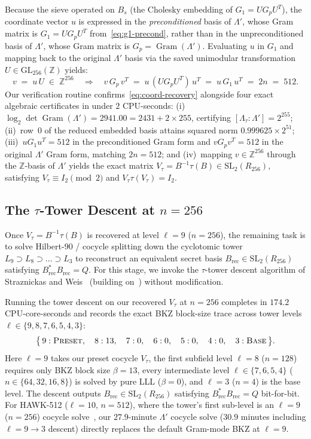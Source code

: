 \documentclass[11pt,a4paper]{article}
\theoremstyle{definition}
\newcommand{\Z}{\mathbb{Z}}
\newcommand{\Lt}{\Lambda_\tau}
\newcommand{\Lp}{\Lambda'}
\newcommand{\Vt}{V_\tau}
\newcommand{\Gram}{\operatorname{Gram}}
\begin{document}
Because the sieve operated on $B_s$ (the Cholesky embedding of $G_1 = U G_p U^T$), the coordinate vector $u$ is expressed in the \emph{preconditioned} basis of $\Lp$, whose Gram matrix is $G_1 = U G_p U^T$ from~\eqref{eq:g1-precond}, rather than in the unpreconditioned basis of $\Lp$, whose Gram matrix is $G_p = \Gram(\Lp)$. Evaluating $u$ in $G_1$ and mapping back to the original $\Lp$ basis via the saved unimodular transformation $U \in \mathrm{GL}_{256}(\Z)$ yields:
\begin{equation}\label{eq:coord-recovery}
  v \;=\; u\,U \;\in\; \Z^{256}
  \quad\Longrightarrow\quad
  v\,G_p\,v^T \;=\; u\,(U G_p U^T)\,u^T \;=\; u\,G_1\,u^T \;=\; 2n \;=\; 512.
\end{equation}
Our verification routine confirms~\eqref{eq:coord-recovery} alongside four exact algebraic certificates in under $2$ CPU-seconds: (i)~$\log_2 \det \Gram(\Lp) = 2941.00 = 2431 + 2 \times 255$, certifying $[\Lt : \Lp] = 2^{255}$; (ii)~row~$0$ of the reduced embedded basis attains squared norm $0.999625 \times 2^{51}$; (iii)~$u G_1 u^T = 512$ in the preconditioned Gram form and $v G_p v^T = 512$ in the original $\Lp$ Gram form, matching $2n = 512$; and (iv)~mapping $v \in \Z^{256}$ through the $\Z$-basis of $\Lp$ yields the exact matrix $\Vt = B^{-1}\tau(B) \in \mathrm{SL}_2(R_{256})$, satisfying $\Vt \equiv I_2 \pmod 2$ and $\Vt\tau(\Vt) = I_2$.

\subsection{The \texorpdfstring{$\tau$}{tau}-Tower Descent at \texorpdfstring{$n=256$}{n=256}}
Once $\Vt = B^{-1}\tau(B)$ is recovered at level $\ell=9$ ($n=256$), the remaining task is to solve Hilbert-90 / cocycle splitting down the cyclotomic tower $L_9 \supset L_8 \supset \dots \supset L_3$ to reconstruct an equivalent secret basis $B_{\mathrm{rec}} \in \mathrm{SL}_2(R_{256})$ satisfying $B_{\mathrm{rec}}^* B_{\mathrm{rec}} = Q$. For this stage, we invoke the $\tau$-tower descent algorithm of Straznickas and Weis~\cite{SW26} (building on~\cite{vGP25}) without modification.

Running the tower descent on our recovered $\Vt$ at $n=256$ completes in $174.2$ CPU-core-seconds and records the exact BKZ block-size trace across tower levels $\ell \in \{9, 8, 7, 6, 5, 4, 3\}$:
\[
  \bigl\{\, 9:\textsc{Preset},\quad 8:13,\quad 7:0,\quad 6:0,\quad 5:0,\quad 4:0,\quad 3:\textsc{Base} \,\bigr\}.
\]
Here $\ell=9$ takes our preset cocycle $\Vt$, the first subfield level $\ell=8$ ($n=128$) requires only BKZ block size $\beta = 13$, every intermediate level $\ell \in \{7, 6, 5, 4\}$ ($n \in \{64, 32, 16, 8\}$) is solved by pure LLL ($\beta = 0$), and $\ell=3$ ($n=4$) is the base level. The descent outputs $B_{\mathrm{rec}} \in \mathrm{SL}_2(R_{256})$ satisfying $B_{\mathrm{rec}}^* B_{\mathrm{rec}} = Q$ bit-for-bit. For HAWK-512 ($\ell=10$, $n=512$), where the tower's first sub-level is an $\ell=9$ ($n=256$) cocycle solve~\cite{SW26}, our $27.9$-minute $\Lp$ cocycle solve ($30.9$ minutes including $\ell=9\to 3$ descent) directly replaces the default Gram-mode BKZ at $\ell=9$.
\end{document}
